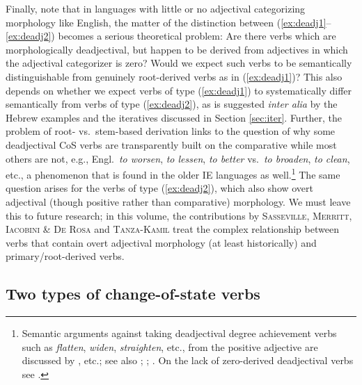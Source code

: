 \documentclass[output=paper,colorlinks,citecolor=brown]{langscibook}
\begin{document}
Finally, note that in languages with little or no adjectival categorizing morphology like English, the matter of the distinction between (\ref{ex:deadj1}--\ref{ex:deadj2}) becomes a serious theoretical problem: Are there verbs which are morphologically deadjectival, but happen to be derived from adjectives in which the adjectival categorizer is zero? Would we expect such verbs to be semantically distinguishable from genuinely root-derived verbs as in (\ref{ex:deadj1})? This also depends on whether we expect verbs of type (\ref{ex:deadj1}) to systematically differ semantically from verbs of type (\ref{ex:deadj2}), as is suggested \textit{inter alia} by the Hebrew examples and the iteratives discussed in Section \ref{sec:iter}. Further, the problem of root- vs.\ stem-based derivation links to the question of why some deadjectival  CoS  verbs are transparently built on the comparative while most others are not, e.g., Engl.\ \textit{to worsen}, \textit{to lessen}, \textit{to better} vs.\ \textit{to broaden}, \textit{to clean}, etc., a phenomenon that is found in the older IE languages as well.\footnote{Semantic arguments against taking deadjectival degree achievement verbs  such as \textit{flatten}, \textit{widen}, \textit{straighten}, etc., from the positive adjective are discussed by \citet[42--45 \& fn.\ 24]{BeaversKoontz2020}, etc.; see also  \citealt[169--207]{Bobaljik2012}; \citealt[46, fn.\ 26]{BeaversKoontz2020};  \citealt[80--90]{Fabregas2023}. On the lack of zero-derived deadjectival verbs see  \citealt{AcedoMatellan2022FSBorer}.} The same question arises for the verbs of type (\ref{ex:deadj2}), which also show overt adjectival (though positive rather than comparative) morphology. We must leave this to future research; in this volume, the contributions by \textsc{Sasseville}, \textsc{Merritt}, \textsc{Iacobini \& De Rosa} and \textsc{Tanza-Kamil} treat the complex relationship between verbs that contain overt adjectival morphology (at least historically) and primary/root-derived verbs.   


\subsection{Two types of change-of-state verbs}
\label{sec:CoS}
\end{document}
